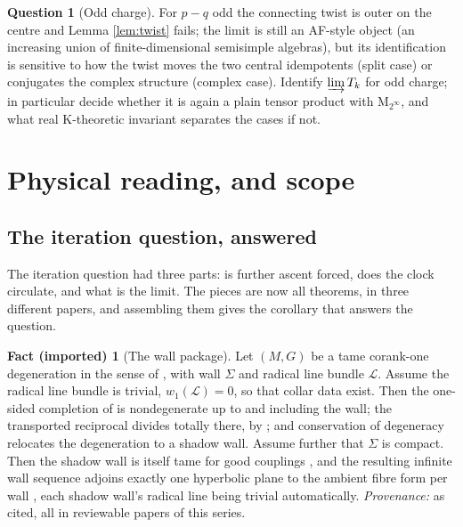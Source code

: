 \documentclass[11pt]{article}
\theoremstyle{definition}
\newtheorem{question}[theorem]{Question}
\newtheorem{fact}[theorem]{Fact (imported)}
\newcommand{\Mat}{\mathrm{M}}
\begin{document}
\begin{question}[Odd charge]\label{q:oddcharge}
For $p - q$ odd the connecting twist is outer on the centre and Lemma \ref{lem:twist} fails; the limit is still an AF-style object (an increasing union of finite-dimensional semisimple algebras), but its identification is sensitive to how the twist moves the two central idempotents (split case) or conjugates the complex structure (complex case). Identify $\varinjlim T_k$ for odd charge; in particular decide whether it is again a plain tensor product with $\Mat_{2^\infty}$, and what real K-theoretic invariant separates the cases if not.
\end{question}

\section{Physical reading, and scope}\label{sec:reading}

\subsection{The iteration question, answered}\label{subsec:iteration}

The iteration question had three parts: is further ascent forced, does the clock circulate, and what is the limit. The pieces are now all theorems, in three different papers, and assembling them gives the corollary that answers the question.

\begin{fact}[The wall package]\label{fact:walls}
Let $(M, G)$ be a tame corank-one degeneration in the sense of \cite[Hyp.~2.1]{ButlerT4}, with wall $\Sigma$ and radical line bundle $\mathcal{L}$. Assume the radical line bundle is trivial, $w_1(\mathcal{L}) = 0$, so that collar data exist. Then the one-sided completion of \cite[Thm.~4.4]{ButlerT4} is nondegenerate up to and including the wall; the transported reciprocal divides totally there, by \cite[Thm.~4.10]{ButlerT1}; and conservation of degeneracy \cite[Thm.~5.1, Prop.~5.2]{ButlerT4} relocates the degeneration to a shadow wall. Assume further that $\Sigma$ is compact. Then the shadow wall is itself tame for good couplings \cite[Lem.~5.3]{ButlerT4}, and the resulting infinite wall sequence adjoins exactly one hyperbolic plane to the ambient fibre form per wall \cite[Rem.~5.4, Cor.~5.5]{ButlerT4}, each shadow wall's radical line being trivial automatically. \emph{Provenance:} as cited, all in reviewable papers of this series.
\end{fact}
\end{document}
